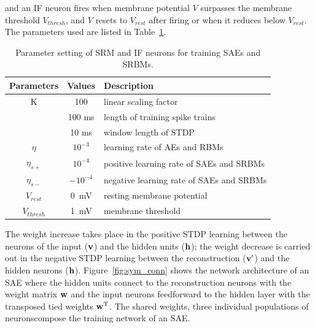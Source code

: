 and an IF neuron fires when \DIFaddbegin {}\DIFaddend membrane potential $V$ surpasses the membrane threshold $V_{thresh}$, and $V$ resets to $V_{rest}$ after firing or when it reduces below \DIFdelbegin {}\DIFdelend $V_{rest}$.
The parameters used are listed in \DIFdelbegin {}\DIFdelend Table~\ref{tbl:srm}.
\begin{table}[th]
	\centering
	\caption{\label{tbl:srm}Parameter setting of SRM and IF neurons for training SAEs and SRBMs.}
	\bgroup
	\def\arraystretch{1.2}
	\begin{tabular}{c c l}
		Parameters & Values & Description \\
		\hline
		K & 100 & linear scaling factor\\
		\DIFdelbeginFL \DIFdelFL{$\tau_{dur}$ }\DIFdelendFL \DIFaddbeginFL \DIFaddFL{$\tau_{\textit{\textrm{dur}}}$ }\DIFaddendFL & 100 ms &  length of training spike trains\\
		\DIFdelbeginFL \DIFdelFL{$\tau_{win}$ }\DIFdelendFL \DIFaddbeginFL \DIFaddFL{$\tau_{\textit{\textrm{win}}}$ }\DIFaddendFL & 10 ms & window length of STDP\\
		$\eta$ & $10^{-3}$ & learning rate of AEs and RBMs\\
		$\eta_{s+}$ & $10^{-4}$ & positive learning rate of SAEs and SRBMs\\
		$\eta_{s-}$ & $-10^{-4}$ & negative learning rate of SAEs and SRBMs\\
		$V_{rest}$ & 0~mV & resting membrane potential\\
		$V_{thresh}$ & 1~mV & membrane threshold  \\
	\end{tabular}
	\egroup
\end{table}


The weight increase takes place in the positive STDP learning between the neurons of the input ($\bf{v}$) and the hidden units ($\bf{h}$); 
the weight decrease is carried out in the negative STDP learning between the reconstruction ($\bf{v'}$) and the hidden neurons ($\bf{h}$).
Figure~\ref{fig:sym_conn} shows the network architecture of an SAE where the hidden units connect to the reconstruction neurons with the weight matrix $\bf{w}$ and the input neurons feedforward to the hidden layer with the transposed tied weights $\bf{w}^\textrm{T}$.
The shared weights, \DIFaddbegin {}\DIFaddend three individual populations of neurons\DIFaddbegin \DIFadd{, }\DIFaddend compose the training network of an SAE.

